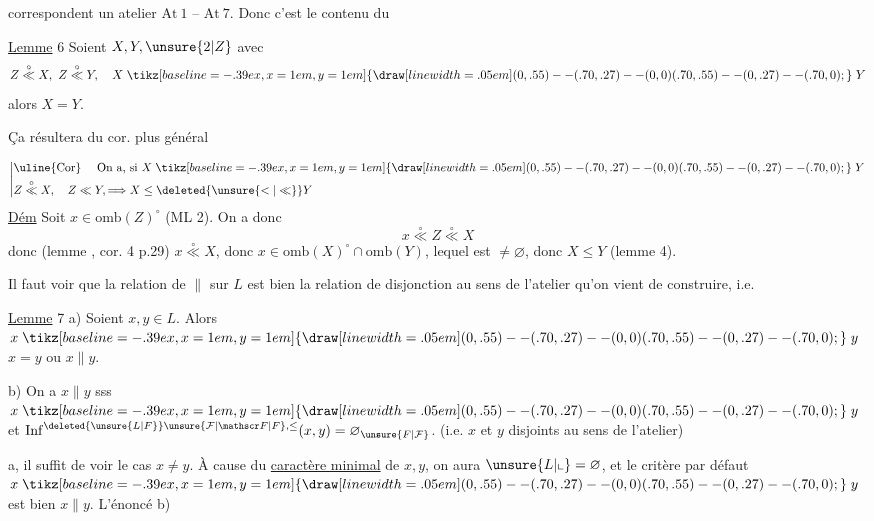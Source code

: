  correspondent  un atelier $\mathrm{At}\ 1$ -- $\mathrm{At}\ 7$. Donc c'est le contenu du

\uline{Lemme} 6 \quad Soient $X,Y,\unsure{2|Z}$ avec
\[
 Z\overset{\circ}{\ll}X,\ Z\overset{\circ}{\ll}Y,\quad X\mathrel{\tikz[baseline=-.39ex,x=1em,y=1em]{\draw[line width=.05em] (0,.55)--(.70,.27)--(0,0) (.70,.55)--(0,.27)--(.70,0);}}Y
\]
alors $X=Y$.

Ça résultera du cor. plus général

\[
\left|\begin{aligned}
&\text{\uline{Cor} \quad On a, si }X\mathrel{\tikz[baseline=-.39ex,x=1em,y=1em]{\draw[line width=.05em] (0,.55)--(.70,.27)--(0,0) (.70,.55)--(0,.27)--(.70,0);}}Y\\
& Z\overset{\circ}{\ll}X,\quad Z\ll Y,\Longrightarrow X\leq\deleted{\unsure{<|\ll}}Y
\end{aligned}\right.
\]
\uline{Dém} \quad Soit $x\in\mathrm{omb}(Z)^\circ$ (ML 2). On a donc 
\[
 x\overset{\circ}{\ll}Z\overset{\circ}{\ll}X
\]
donc (lemme , cor. 4 p.29) $x\overset{\circ}{\ll}X$, donc $x\in\mathrm{omb}(X)^\circ\cap\mathrm{omb}(Y)$, lequel est $\neq\varnothing$, donc $X\leq Y$ (lemme 4).

Il faut voir que la relation de  $\parallel$ sur $L$ est bien la relation de disjonction au sens de l'atelier qu'on vient de construire, i.e.

\uline{Lemme} 7 \quad {} a) Soient $x,y\in L$. Alors $x\mathrel{\tikz[baseline=-.39ex,x=1em,y=1em]{\draw[line width=.05em] (0,.55)--(.70,.27)--(0,0) (.70,.55)--(0,.27)--(.70,0);}}y$  $x=y$ ou $x\parallel y$.

b) On a $x\parallel y$ sss $x\mathrel{\tikz[baseline=-.39ex,x=1em,y=1em]{\draw[line width=.05em] (0,.55)--(.70,.27)--(0,0) (.70,.55)--(0,.27)--(.70,0);}}y$ et $\mathrm{Inf}^{\deleted{\unsure{L|F}}\unsure{\mathcal F|\mathscr F|F},\leq}(x,y)=\varnothing_{\unsure{F|\mathcal F}}$. (i.e. $x$ et $y$ disjoints au sens de l'atelier)

 a, il suffit de voir le cas $x\neq y$. À cause du \uline{caractère minimal} de $x,y$, on aura  $\unsure{L|\llcorner}=\varnothing$, et le critère  par défaut $x\mathrel{\tikz[baseline=-.39ex,x=1em,y=1em]{\draw[line width=.05em] (0,.55)--(.70,.27)--(0,0) (.70,.55)--(0,.27)--(.70,0);}}y$ est bien $x\parallel y$. L'énoncé b) 
